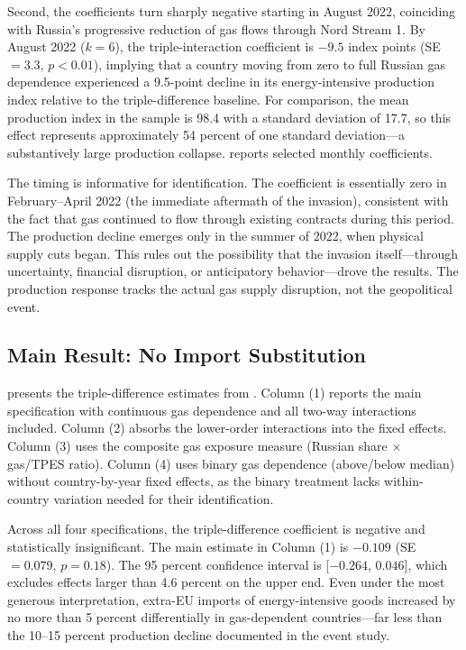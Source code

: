 \documentclass[12pt]{article}
\begin{document}
Second, the coefficients turn sharply negative starting in August 2022, coinciding with Russia's progressive reduction of gas flows through Nord Stream 1. By August 2022 ($k = 6$), the triple-interaction coefficient is $-9.5$ index points (SE $= 3.3$, $p < 0.01$), implying that a country moving from zero to full Russian gas dependence experienced a 9.5-point decline in its energy-intensive production index relative to the triple-difference baseline. For comparison, the mean production index in the sample is 98.4 with a standard deviation of 17.7, so this effect represents approximately 54 percent of one standard deviation---a substantively large production collapse.  reports selected monthly coefficients.



The timing is informative for identification. The coefficient is essentially zero in February--April 2022 (the immediate aftermath of the invasion), consistent with the fact that gas continued to flow through existing contracts during this period. The production decline emerges only in the summer of 2022, when physical supply cuts began. This rules out the possibility that the invasion itself---through uncertainty, financial disruption, or anticipatory behavior---drove the results. The production response tracks the actual gas supply disruption, not the geopolitical event.

\subsection{Main Result: No Import Substitution}

 presents the triple-difference estimates from . Column (1) reports the main specification with continuous gas dependence and all two-way interactions included. Column (2) absorbs the lower-order interactions into the fixed effects. Column (3) uses the composite gas exposure measure (Russian share $\times$ gas/TPES ratio). Column (4) uses binary gas dependence (above/below median) without country-by-year fixed effects, as the binary treatment lacks within-country variation needed for their identification.



Across all four specifications, the triple-difference coefficient is negative and statistically insignificant. The main estimate in Column (1) is $-0.109$ (SE $= 0.079$, $p = 0.18$). The 95 percent confidence interval is [$-0.264$, $0.046$], which excludes effects larger than 4.6 percent on the upper end. Even under the most generous interpretation, extra-EU imports of energy-intensive goods increased by no more than 5 percent differentially in gas-dependent countries---far less than the 10--15 percent production decline documented in the event study.
\end{document}
